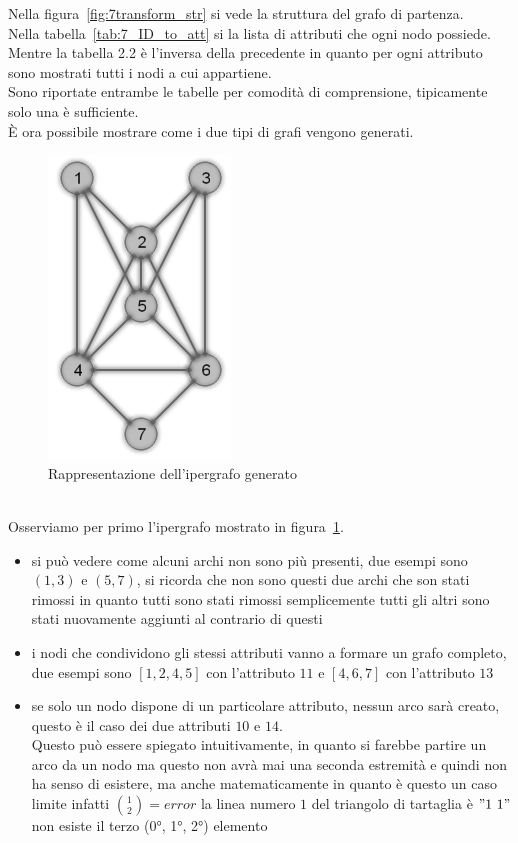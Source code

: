 %
%
\noindent Nella figura~\ref{fig:7transform_str} si vede la struttura del grafo di partenza.\\
Nella tabella~\ref{tab:7_ID_to_att} si la lista di attributi che ogni nodo possiede.\\
Mentre la tabella 2.2 %
è l'inversa della precedente in quanto per ogni attributo sono mostrati tutti i nodi a cui appartiene.\\
Sono riportate entrambe le tabelle per comodità di comprensione, tipicamente solo una è sufficiente.\\
È ora possibile mostrare come i due tipi di grafi vengono generati.
%
\begin{figure}[htp]
	\centering
	\includegraphics{immagini/7transform_hyper}
	\caption{Rappresentazione dell'ipergrafo generato}
	\label{fig:7transform_hyper}
\end{figure}
\\
Osserviamo per primo l'ipergrafo mostrato in figura~\ref{fig:7transform_hyper}.
\begin{itemize}
	\item  si può vedere come alcuni archi non sono più presenti, due esempi sono $(1,3)$ e $(5,7)$, si ricorda che non sono questi due archi che son stati rimossi in quanto tutti sono stati rimossi semplicemente tutti gli altri sono stati nuovamente aggiunti al contrario di questi
	\item  i nodi che condividono gli stessi attributi vanno a formare un grafo completo, due esempi sono $[1,2,4,5]$ con l'attributo $11$ e $[4,6,7]$ con l'attributo $13$
	\item  se solo un nodo dispone di un particolare attributo, nessun arco sarà creato, questo è il caso dei due attributi $10$ e $14$.\\
	Questo può essere spiegato intuitivamente, in quanto si farebbe partire un arco da un nodo ma questo non avrà mai una seconda estremità e quindi non ha senso di esistere, ma anche matematicamente in quanto è questo un caso limite infatti $ \displaystyle\binom{1}{2} = error$ la linea numero $1$ del triangolo di tartaglia è $"1\ 1"$ non esiste il terzo (0°, 1°, 2°) elemento
\end{itemize}
